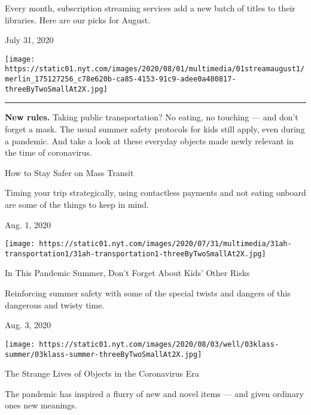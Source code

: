 Every month, subscription streaming services add a new batch of titles
to their libraries. Here are our picks for August.

July 31, 2020

\texttt{[image: https://static01.nyt.com/images/2020/08/01/multimedia/01streamaugust1/merlin\_175127256\_c78e620b-ca85-4153-91c9-adee0a480817-threeByTwoSmallAt2X.jpg]}

\begin{center}\rule{0.5\linewidth}{\linethickness}\end{center}

\textbf{New rules.} Taking public transportation? No eating, no touching
--- and don't forget a mask. The usual summer safety protocols for kids
still apply, even during a pandemic. And take a look at these everyday
objects made newly relevant in the time of coronavirus.

\href{https://www.nytimes.com/2020/08/01/at-home/coronavirus-public-transportation-subway.html?action=click\&module=RelatedLinks\&pgtype=collection}{}

How to Stay Safer on Mass Transit

Timing your trip strategically, using contactless payments and not
eating onboard are some of the things to keep in mind.

Aug. 1, 2020

\texttt{[image: https://static01.nyt.com/images/2020/07/31/multimedia/31ah-transportation1/31ah-transportation1-threeByTwoSmallAt2X.jpg]}

\href{https://www.nytimes.com/2020/08/03/well/family/children-summer-safety.html?action=click\&module=RelatedLinks\&pgtype=collection}{}

In This Pandemic Summer, Don't Forget About Kids' Other Risks

Reinforcing summer safety with some of the special twists and dangers of
this dangerous and twisty time.

Aug. 3, 2020

\texttt{[image: https://static01.nyt.com/images/2020/08/03/well/03klass-summer/03klass-summer-threeByTwoSmallAt2X.jpg]}

\href{https://www.nytimes.com/2020/08/01/arts/design/virus-design-objects.html?action=click\&module=RelatedLinks\&pgtype=collection}{}

The Strange Lives of Objects in the Coronavirus Era

The pandemic has inspired a flurry of new and novel items --- and given
ordinary ones new meanings.


